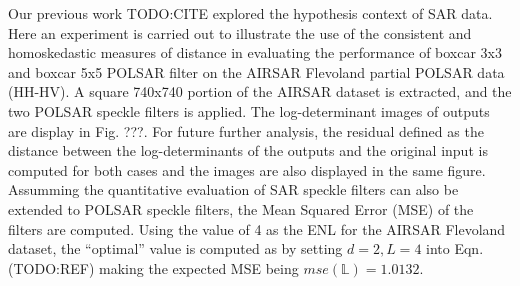 Our previous work TODO:CITE explored the hypothesis context of SAR data.
Here an experiment is carried out to illustrate the use of the consistent and homoskedastic measures of distance in evaluating the performance of boxcar 3x3 and boxcar 5x5 POLSAR filter on the AIRSAR Flevoland partial POLSAR data (HH-HV).
A square 740x740 portion of the AIRSAR dataset is extracted, and the two POLSAR speckle filters is applied.
The log-determinant images of outputs are display in Fig. ???.
For future further analysis, the residual defined as the distance between the log-determinants of the outputs and the original input is computed for both cases and the images are also displayed in the same figure.
Assumming the quantitative evaluation of SAR speckle filters can also be extended to POLSAR speckle filters,
  the Mean Squared Error (MSE) of the filters are computed.
Using the value of 4 as the ENL for the AIRSAR Flevoland dataset,
  the ``optimal'' value is computed as
by setting $d=2,L=4$ into Eqn. (TODO:REF) making the expected MSE being $mse(\mathbb{L})=1.0132$.


